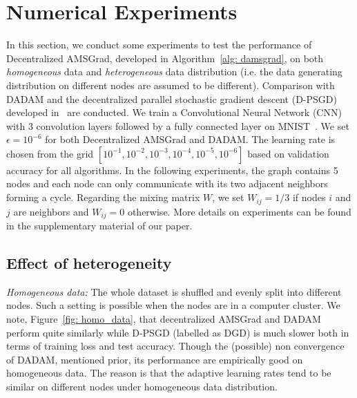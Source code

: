 \documentclass[anon,12pt]{colt2021} %
\begin{document}
\vspace{-0.15in}
\section{Numerical Experiments} \label{sec:numerical}
\vspace{-0.05in}

In this section, we conduct some experiments to test the performance of Decentralized AMSGrad, developed in Algorithm~\ref{alg: damsgrad}, on both \emph{homogeneous} data and \emph{heterogeneous} data distribution (i.e. the data generating distribution on different nodes are assumed to be different). 
Comparison with DADAM and the decentralized parallel stochastic gradient descent (D-PSGD) developed in~\cite{lian2017can} are conducted. 
We train a Convolutional Neural Network (CNN) with 3 convolution layers followed by a fully connected layer on MNIST~\cite{lecun1998mnist}.
We set $\epsilon = 10^{-6}$ for both Decentralized AMSGrad and DADAM.
The learning rate is chosen from the grid $[10^{-1}, 10^{-2}, 10^{-3}, 10^{-4}, 10^{-5}, 10^{-6}]$ based on validation accuracy for all algorithms. 
In the following experiments, the graph contains 5 nodes and each node can only communicate with its two adjacent neighbors forming a cycle.
Regarding the mixing matrix $W$, we set $W_{ij} = 1/3$ if nodes $i$ and $j$ are neighbors and $W_{ij} = 0$ otherwise.
More details on experiments can be found in the supplementary material of our paper.

\subsection{Effect of heterogeneity}




\textit{Homogeneous data:}
The whole dataset is shuffled and evenly split into different nodes. {Such a setting is possible when the nodes are in a computer cluster.}
We note, Figure~\ref{fig: homo_data}, that decentralized AMSGrad and DADAM perform quite similarly while D-PSGD (labelled as DGD) is much slower both in terms of training loss and test accuracy. 
Though the (possible) non convergence of DADAM, mentioned prior, its performance are empirically good on homogeneous data. 
The reason is that the adaptive learning rates tend to be similar on different nodes under homogeneous data distribution. 
\end{document}
